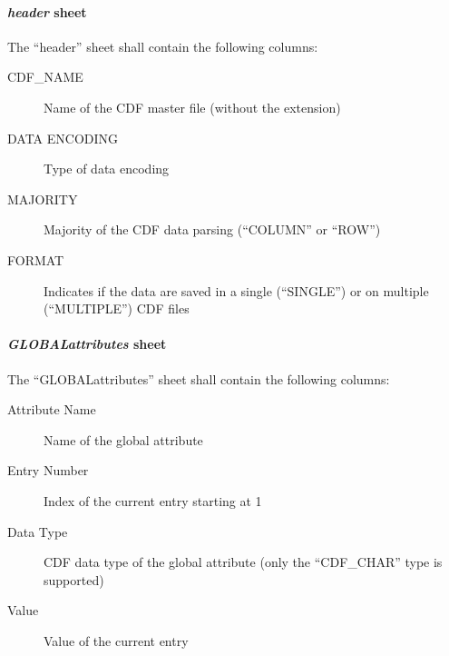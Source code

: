\documentclass[letterpaper,10pt,english]{sphinxmanual}
\begin{document}
\paragraph{\emph{header} sheet}
\label{cdf:header-sheet}
The ``header'' sheet shall contain the following columns:
\begin{description}
\item[{CDF\_NAME}] \leavevmode
Name of the CDF master file (without the extension)

\item[{DATA ENCODING}] \leavevmode
Type of data encoding

\item[{MAJORITY}] \leavevmode
Majority of the CDF data parsing (``COLUMN'' or ``ROW'')

\item[{FORMAT}] \leavevmode
Indicates if the data are saved in a single (``SINGLE'') or
on multiple (``MULTIPLE'') CDF files

\end{description}


\paragraph{\emph{GLOBALattributes} sheet}
\label{cdf:globalattributes-sheet}
The ``GLOBALattributes'' sheet shall contain the following columns:
\begin{description}
\item[{Attribute Name}] \leavevmode
Name of the global attribute

\item[{Entry Number}] \leavevmode
Index of the current entry starting at 1

\item[{Data Type}] \leavevmode
CDF data type of the global attribute (only the ``CDF\_CHAR'' type is supported)

\item[{Value}] \leavevmode
Value of the current entry

\end{description}
\end{document}
